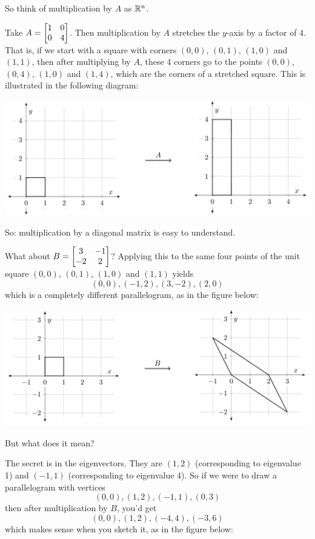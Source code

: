 So think of multiplication by $A$ as  
$\mathbb{R}^n$.  

\begin{myexample} Take
$A = \left[ \begin{matrix} 1 & 0 \\ 0 & 4 \end{matrix} \right]$.
Then multiplication by $A$ stretches the $y$-axis by a factor
of $4$.  That is, if we start with a square with
corners $(0,0)$, $(0,1)$, $(1,0)$ and $(1,1)$, 
then after multiplying by $A$, these 4 corners go
to the points $(0,0)$, $(0,4)$, $(1,0)$ and $(1,4)$,
which are the corners of a stretched square.  This is illustrated in the following diagram:

\begin{center}
\includegraphics[scale=.6]{img/TransformationA.jpg}
\end{center}

So:  multiplication by a diagonal matrix is easy to understand.

What about $B = \left[ \begin{matrix} 3&-1\\-2&2 \end{matrix} \right]$?  Applying this to
the same four points of the unit square $(0,0)$, $(0,1)$, $(1,0)$ and $(1,1)$
yields
$$
(0,0), (-1,2), (3,-2), (2,0)
$$
which is a completely different parallelogram, as in the figure below:

\begin{center}
\includegraphics[scale=.6]{img/TransformationB1.jpg}
\end{center}

But what does it mean?  

The secret is in the eigenvectors.  They are $(1,2)$ (corresponding
to eigenvalue 1) and $(-1,1)$ (corresponding to eigenvalue 4).
So if we were to draw a parallelogram with vertices
$$
(0,0), (1,2), (-1,1), (0,3)
$$
then after multiplication by $B$, you'd get
$$
(0,0), (1,2), (-4,4), (-3, 6)
$$
which makes sense when you sketch it, as in the figure below:


\end{myexample}
